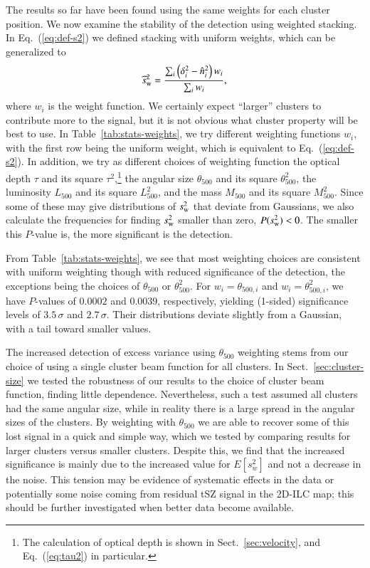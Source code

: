 \documentclass[traditabstract, longauth]{aa}
\newcommand{\1}{\'\i }
\begin{document}
The results so far have been found using the same weights for each cluster
position. We now examine the stability of the detection using
weighted stacking. In Eq.~(\ref{eq:def-s2}) we defined stacking with uniform
weights, which can be generalized to
\begin{eqnarray}
\widehat{s}^{2}_{\rm w}= \frac{\sum_{i}\left(\delta^{2}_{i} -\hat{n}^{2}_{i} \right) w_{i}}{\sum_{i} w_{i}} , \label{eq:def-sw}
\end{eqnarray}
where $w_{i}$ is the weight function. We certainly expect ``larger'' clusters
to contribute more to the signal, but it is not obvious what cluster property
will be best to use.  In Table~\ref{tab:stats-weights}, we try different
weighting functions $w_{i}$, with the first row being the uniform weight, which
is equivalent to Eq.~(\ref{eq:def-s2}). In addition, we try as different
choices of weighting function the optical depth $\tau$ and its square
$\tau^{2}$,\footnote{The calculation of optical depth is shown in
Sect.~\ref{sec:velocity}, and Eq.~(\ref{eq:tau2}) in particular.} the angular
size $\theta_{500}$ and its square $\theta^{2}_{500}$, the luminosity $L_{500}$
and its square $L^{2}_{500}$, and the mass $M_{500}$ and its square
$M^{2}_{500}$. Since some of these may give distributions of $s^{2}_{\rm w}$
that deviate from Gaussians, we also calculate the frequencies for finding
$s^{2}_{\rm w}$ smaller than zero, $P(s^{2}_{\rm w})<0$. The smaller this
$P$-value is, the more significant is the detection.

From Table~\ref{tab:stats-weights}, we see that most weighting choices are
consistent with uniform weighting though with reduced
significance of the detection, the exceptions being the choices of
$\theta_{500}$ or $\theta_{500}^2$. For $w_{i}=\theta_{500, i}$ and
$w_{i}=\theta^{2}_{500, i}$, we have $P$-values of $0.0002$ and $0.0039$,
respectively, yielding (1-sided) significance levels of $3.5\,\sigma$ and
$2.7\,\sigma$. Their distributions deviate slightly from a Gaussian, with a
tail toward smaller values.

The increased detection of excess variance using $\theta_{500}$ weighting stems
from our choice of using a single cluster beam function for all clusters. In
Sect.~\ref{sec:cluster-size} we tested the robustness of our results to the
choice of cluster beam function, finding little dependence. Nevertheless, such
a test assumed all clusters had the same angular size, while in
reality there is a large spread in the angular sizes of the clusters.
By weighting with $\theta_{500}$ we are able to
recover some of this lost signal in a quick and simple way, which we tested
by comparing results for larger clusters versus smaller clusters.
Despite this, we find that the increased significance is mainly due to the
increased value for $E[s^2_w]$ and not a decrease in the noise. This tension may be evidence of systematic effects in the data or potentially some noise coming from residual tSZ signal in the 2D-ILC map; this should be
further investigated when better data become available.
\end{document}
